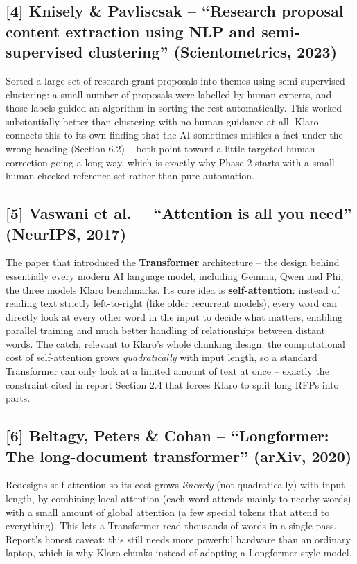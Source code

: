 \documentclass[11pt,a4paper]{article}
\begin{document}
\subsection*{[4] Knisely \& Pavliscsak -- ``Research proposal content extraction using NLP and
semi-supervised clustering'' (Scientometrics, 2023)}
Sorted a large set of research grant proposals into themes using semi-supervised clustering: a small
number of proposals were labelled by human experts, and those labels guided an algorithm in sorting
the rest automatically. This worked substantially better than clustering with no human guidance at
all. Klaro connects this to its own finding that the AI sometimes misfiles a fact under the wrong
heading (Section 6.2) -- both point toward a little targeted human correction going a long way, which
is exactly why Phase 2 starts with a small human-checked reference set rather than pure automation.

\subsection*{[5] Vaswani et al.\ -- ``Attention is all you need'' (NeurIPS, 2017)}
The paper that introduced the \textbf{Transformer} architecture -- the design behind essentially every
modern AI language model, including Gemma, Qwen and Phi, the three models Klaro benchmarks. Its core
idea is \textbf{self-attention}: instead of reading text strictly left-to-right (like older recurrent
models), every word can directly look at every other word in the input to decide what matters,
enabling parallel training and much better handling of relationships between distant words. The
catch, relevant to Klaro's whole chunking design: the computational cost of self-attention grows
\emph{quadratically} with input length, so a standard Transformer can only look at a limited amount of
text at once -- exactly the constraint cited in report Section 2.4 that forces Klaro to split long
RFPs into parts.

\subsection*{[6] Beltagy, Peters \& Cohan -- ``Longformer: The long-document transformer'' (arXiv,
2020)}
Redesigns self-attention so its cost grows \emph{linearly} (not quadratically) with input length, by
combining local attention (each word attends mainly to nearby words) with a small amount of global
attention (a few special tokens that attend to everything). This lets a Transformer read thousands of
words in a single pass. Report's honest caveat: this still needs more powerful hardware than an
ordinary laptop, which is why Klaro chunks instead of adopting a Longformer-style model.
\end{document}
